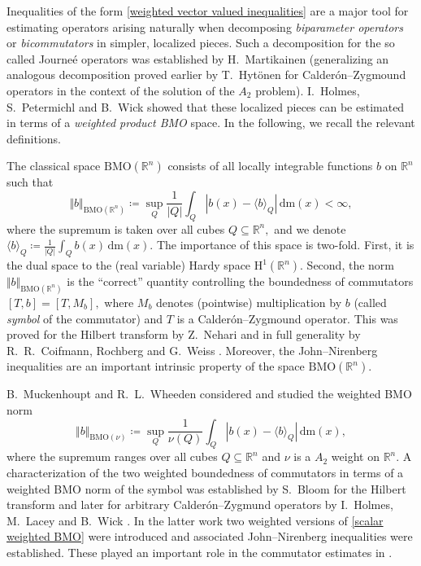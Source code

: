\documentclass{article}
\theoremstyle{definition}
\theoremstyle{remark}
\numberwithin{equation}{section}
\newcommand{\mathdm}{\,\mathrm{dm}}
\newcommand{\reals}{\mathbb{R}}
\newcommand{\1}{\mathbf{1}}
\begin{document}
    Inequalities of the form \eqref{weighted vector valued inequalities} are a major tool for estimating operators arising naturally when decomposing \emph{biparameter operators} or \emph{bicommutators} in simpler, localized pieces. Such a decomposition for the so called Journe\'e operators was established by H.~Martikainen \cite{Martikainen_2012} (generalizing an analogous decomposition proved earlier by T.~Hyt\"{o}nen \cite{Hytonen_2012} for Calder\'{o}n--Zygmound operators in the context of the solution of the $A_2$ problem). I.~Holmes, S.~Petermichl and B.~Wick \cite{Holmes_Petermichl_Wick_2018} showed that these localized pieces can be estimated in terms of a \emph{weighted product BMO} space. In the following, we recall the relevant definitions.
    
    The classical space $\text{BMO}(\reals^n)$ consists of all locally integrable functions $b$ on $\reals^n$ such that
    \begin{equation*}
        \Vert b\Vert_{\text{BMO}(\reals^n)}\coloneq \sup_{Q}\frac{1}{|Q|}\int_{Q}|b(x)-\langle b\rangle_{Q}|\mathdm(x)<\infty,
    \end{equation*}
    where the supremum is taken over all cubes $Q\subseteq\reals^n,$ and we denote $\langle b \rangle_Q\coloneq \frac{1}{|Q|}\int_{Q}b(x)\mathdm(x).$ The importance of this space is two-fold. First, it is the dual space to the (real variable) Hardy space $\mathrm{H}^1(\reals^n).$ Second, the norm $\Vert b\Vert_{\mathrm{BMO}(\reals^n)}$ is the ``correct'' quantity controlling the boundedness of commutators $[T,b]=[T,M_{b}],$ where $M_{b}$ denotes (pointwise) multiplication by $b$ (called \emph{symbol} of the commutator) and $T$ is a Calder\'{o}n--Zygmound operator. This was proved for the Hilbert transform by Z.~Nehari \cite{Nehari_1957} and in full generality by R.~R.~Coifmann, Rochberg and G.~Weiss \cite{Coifman_Rochberg_Weiss_1976}. Moreover, the John--Nirenberg inequalities are an important intrinsic property of the space $\mathrm{BMO}(\reals^n).$
    
    B.~Muckenhoupt and R.~L.~Wheeden \cite{Muckenhoupt_Wheeden_BMO_1976} considered and studied the weighted BMO norm
    \begin{equation}
        \label{scalar weighted BMO}
        \Vert b\Vert_{\mathrm{BMO}(\nu)}\coloneq \sup_{Q}\frac{1}{\nu(Q)}\int_{Q}|b(x)-\langle b\rangle_{Q}|\mathdm(x),
    \end{equation}
    where the supremum ranges over all cubes $Q\subseteq\reals^n$ and $\nu$ is a $A_2$ weight on $\reals^n.$ A characterization of the two weighted boundedness of commutators in terms of a weighted BMO norm of the symbol was established by S.~Bloom \cite{Bloom_1985} for the Hilbert transform and later for arbitrary Calder\'{o}n--Zygmund operators by I.~Holmes, M.~Lacey and B.~Wick \cite{Holmes_Lacey_Wick_2016}. In the latter work two weighted versions of \eqref{scalar weighted BMO} were introduced and associated John--Nirenberg inequalities were established. These played an important role in the commutator estimates in \cite{Holmes_Lacey_Wick_2016}.
\end{document}
